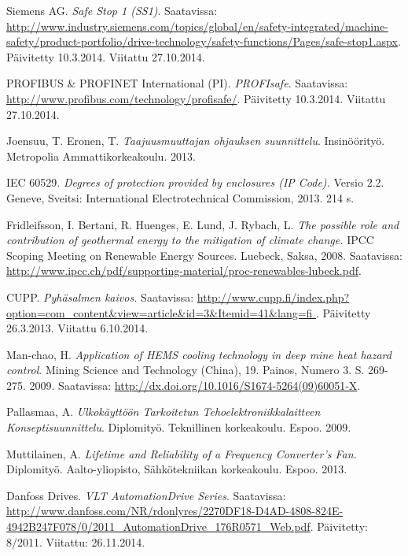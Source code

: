 \documentclass[finnish,12pt,a4paper,pdftex,elec,utf8]{aaltothesis}
\begin{document}
\begin{thebibliography}{99}
Siemens AG. \textit{Safe Stop 1 (SS1)}. Saatavissa: \url{http://www.industry.siemens.com/topics/global/en/safety-integrated/machine-safety/product-portfolio/drive-technology/safety-functions/Pages/safe-stop1.aspx}. Päivitetty 10.3.2014. Viitattu 27.10.2014.

 PROFIBUS \& PROFINET International (PI). \textit{PROFIsafe}. Saatavissa: \url{http://www.profibus.com/technology/profisafe/}. Päivitetty 10.3.2014. Viitattu 27.10.2014.

Joensuu, T. Eronen, T. \textit{Taajuusmuuttajan ohjauksen suunnittelu}. Insinöörityö. Metropolia Ammattikorkeakoulu. 2013.%

IEC 60529. \textit{Degrees of protection provided by enclosures (IP Code).} Versio 2.2. Geneve, Sveitsi: International Electrotechnical Commission, 2013. 214 s.

Fridleifsson, I. Bertani, R. Huenges, E. Lund, J. Rybach, L. \textit{The possible role and contribution of geothermal energy to the mitigation of climate change.} IPCC Scoping Meeting on Renewable Energy Sources. Luebeck, Saksa, 2008. Saatavissa: \url{http://www.ipcc.ch/pdf/supporting-material/proc-renewables-lubeck.pdf}.

CUPP. \textit{Pyhäsalmen kaivos.} Saatavissa: \url{http://www.cupp.fi/index.php?option=com_content&view=article&id=3&Itemid=41&lang=fi	}. Päivitetty 26.3.2013. Viitattu 6.10.2014.

Man-chao, H. \textit{Application of HEMS cooling technology in deep mine heat hazard control}. Mining Science and Technology (China), 19. Painos, Numero 3. S. 269-275. 2009. Saatavissa: \url{http://dx.doi.org/10.1016/S1674-5264(09)60051-X}.

Pallasmaa, A. \textit{Ulkokäyttöön Tarkoitetun Tehoelektroniikkalaitteen Konseptisuunnittelu}. Diplomityö. Teknillinen korkeakoulu. Espoo. 2009.

Muttilainen, A. \textit{Lifetime and Reliability of a Frequency Converter’s Fan.} Diplomityö. Aalto-yliopisto, Sähkötekniikan korkeakoulu. Espoo. 2013.

Danfoss Drives. \textit{VLT AutomationDrive Series}. Saatavissa: \url{http://www.danfoss.com/NR/rdonlyres/2270DF18-D4AD-4808-824E-4942B247F078/0/2011_AutomationDrive_176R0571_Web.pdf}. Päivitetty: 8/2011. Viitattu: 26.11.2014.


\end{thebibliography}
\end{document}
